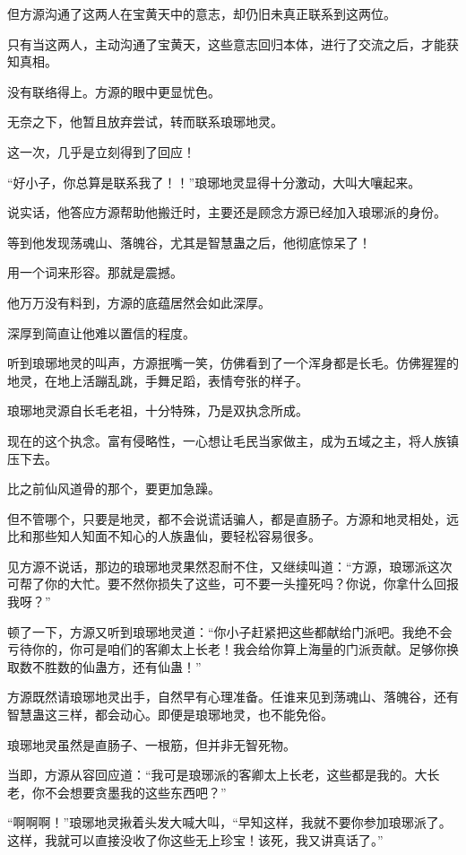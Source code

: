 \begin{this_body}
但方源沟通了这两人在宝黄天中的意志，却仍旧未真正联系到这两位。

只有当这两人，主动沟通了宝黄天，这些意志回归本体，进行了交流之后，才能获知真相。

没有联络得上。方源的眼中更显忧色。

无奈之下，他暂且放弃尝试，转而联系琅琊地灵。

这一次，几乎是立刻得到了回应！

“好小子，你总算是联系我了！！”琅琊地灵显得十分激动，大叫大嚷起来。

说实话，他答应方源帮助他搬迁时，主要还是顾念方源已经加入琅琊派的身份。

等到他发现荡魂山、落魄谷，尤其是智慧蛊之后，他彻底惊呆了！

用一个词来形容。那就是震撼。

他万万没有料到，方源的底蕴居然会如此深厚。

深厚到简直让他难以置信的程度。

听到琅琊地灵的叫声，方源抿嘴一笑，仿佛看到了一个浑身都是长毛。仿佛猩猩的地灵，在地上活蹦乱跳，手舞足蹈，表情夸张的样子。

琅琊地灵源自长毛老祖，十分特殊，乃是双执念所成。

现在的这个执念。富有侵略性，一心想让毛民当家做主，成为五域之主，将人族镇压下去。

比之前仙风道骨的那个，要更加急躁。

但不管哪个，只要是地灵，都不会说谎话骗人，都是直肠子。方源和地灵相处，远比和那些知人知面不知心的人族蛊仙，要轻松容易很多。

见方源不说话，那边的琅琊地灵果然忍耐不住，又继续叫道：“方源，琅琊派这次可帮了你的大忙。要不然你损失了这些，可不要一头撞死吗？你说，你拿什么回报我呀？”

顿了一下，方源又听到琅琊地灵道：“你小子赶紧把这些都献给门派吧。我绝不会亏待你的，你可是咱们的客卿太上长老！我会给你算上海量的门派贡献。足够你换取数不胜数的仙蛊方，还有仙蛊！”

方源既然请琅琊地灵出手，自然早有心理准备。任谁来见到荡魂山、落魄谷，还有智慧蛊这三样，都会动心。即便是琅琊地灵，也不能免俗。

琅琊地灵虽然是直肠子、一根筋，但并非无智死物。

当即，方源从容回应道：“我可是琅琊派的客卿太上长老，这些都是我的。大长老，你不会想要贪墨我的这些东西吧？”

“啊啊啊！”琅琊地灵揪着头发大喊大叫，“早知这样，我就不要你参加琅琊派了。这样，我就可以直接没收了你这些无上珍宝！该死，我又讲真话了。”


\end{this_body}
